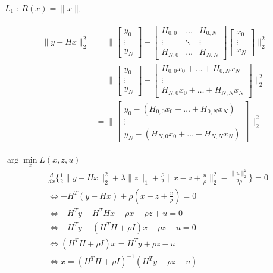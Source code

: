 \begin{frame}{$L_{1}$ : $R(x) = \lVert x \rVert_{1}$}

\begin{align*}
\lVert y - Hx \rVert_{2}^{2}
&= \lVert \begin{bmatrix} y_{0} \\ \vdots \\ y_{N} \end{bmatrix}
- \begin{bmatrix}
    H_{0, 0} & \hdots & H_{0, N} \\
    \vdots & \ddots & \vdots \\
    H_{N, 0} & \hdots & H_{N, N}
\end{bmatrix} \begin{bmatrix} 
    x_{0} \\ \vdots \\ x_{N} 
\end{bmatrix} \rVert_{2}^{2} \\
&= \lVert \begin{bmatrix} y_{0} \\ \vdots \\ y_{N} \end{bmatrix}
- \begin{bmatrix}
    H_{0, 0} x_{0} + \dots + H_{0, N} x_{N} \\
    \vdots \\
    H_{N, 0} x_{0} + \dots + H_{N, N} x_{N}
\end{bmatrix} \rVert_{2}^{2} \\
&= \lVert \begin{bmatrix}
    y_{0} - (H_{0, 0} x_{0} + \dots + H_{0, N} x_{N}) \\
    \vdots \\
    y_{N} - (H_{N, 0} x_{0} + \dots + H_{N, N} x_{N})
\end{bmatrix} \rVert_{2}^{2} \\
\end{align*}

\end{frame}

\begin{frame}{$\arg\min\limits_{x} {L(x, z, u)}$}
\begin{align*}
&\frac{d}{dx} \{
    \frac{1}{2} \lVert y - Hx \rVert_{2}^{2} 
    + \lambda \lVert z \rVert_{1} 
    + \frac{\rho}{2} \lVert x - z + \frac{u}{\rho} \rVert_{2}^{2} 
    - \frac{\lVert u \rVert_{2}^{2}}{2\rho}
\} = 0 \\
&\iff -H^{T} (y - Hx) + \rho (x - z + \frac{u}{\rho}) = 0 \\
&\iff -H^{T} y + H^{T} H x + \rho x - \rho z + u = 0 \\
&\iff -H^{T} y + (H^{T}H + \rho I) x - \rho z + u = 0 \\
&\iff (H^{T}H + \rho I) x = H^{T}y + \rho z - u\\
&\iff x = (H^{T}H + \rho I)^{-1} (H^{T} y + \rho z - u) \\
\end{align*}
\end{frame}

